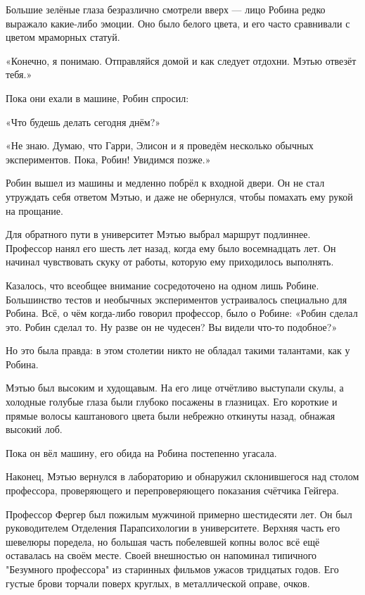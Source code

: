 \documentclass[a4paper,12pt]{book}
\begin{document}
\par
Большие зелёные глаза безразлично смотрели вверх — лицо Робина редко выражало какие-либо эмоции. Оно было белого цвета, и его часто сравнивали с цветом мраморных статуй.
\par
«Конечно, я понимаю. Отправляйся домой и как следует отдохни. Мэтью отвезёт тебя.»\\
\par
Пока они ехали в машине, Робин спросил:
\par
«Что будешь делать сегодня днём?»
\par
«Не знаю. Думаю, что Гарри, Элисон и я проведём несколько обычных экспериментов. Пока, Робин! Увидимся позже.»
\par
Робин вышел из машины и медленно побрёл к входной двери. Он не стал утруждать себя ответом Мэтью, и даже не обернулся, чтобы помахать ему рукой на прощание.\\
\par
Для обратного пути в университет Мэтью выбрал маршрут подлиннее. Профессор нанял его шесть лет назад, когда ему было восемнадцать лет. Он начинал чувствовать скуку от работы, которую ему приходилось выполнять.
\par
Казалось, что всеобщее внимание сосредоточено на одном лишь Робине. Большинство тестов и необычных экспериментов устраивалось специально для Робина. Всё, о чём когда-либо говорил профессор, было о Робине: «Робин сделал это. Робин сделал то. Ну разве он не чудесен? Вы видели что-то подобное?»
\par
Но это была правда: в этом столетии никто не обладал такими талантами, как у Робина.\\
\par
Мэтью был высоким и худощавым. На его лице отчётливо выступали скулы, а холодные голубые глаза были глубоко посажены в глазницах. Его короткие и прямые волосы каштанового цвета были небрежно откинуты назад, обнажая высокий лоб.
\par
Пока он вёл машину, его обида на Робина постепенно угасала.\\
\par
Наконец, Мэтью вернулся в лабораторию и обнаружил склонившегося над столом профессора, проверяющего и перепроверяющего показания счётчика Гейгера.
\par
Профессор Фергер был пожилым мужчиной примерно шестидесяти лет. Он был руководителем Отделения Парапсихологии в университете. Верхняя часть его шевелюры поредела, но большая часть побелевшей копны волос всё ещё оставалась на своём месте. Своей внешностью он напоминал типичного "Безумного профессора" из старинных фильмов ужасов тридцатых годов. Его густые брови торчали поверх круглых, в металлической оправе, очков.
\end{document}
